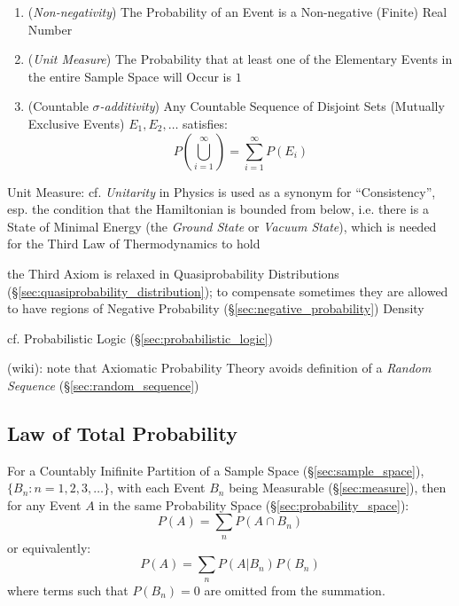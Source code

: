 \begin{enumerate}
  \item (\emph{Non-negativity}) The Probability of an Event is a Non-negative
    (Finite) Real Number
  \item (\emph{Unit Measure}) The Probability that at least one of the
    Elementary Events in the entire Sample Space will Occur is $1$
  \item (Countable \emph{$\sigma$-additivity}) Any Countable Sequence of
    Disjoint Sets (Mutually Exclusive Events) $E_1, E_2, \ldots$ satisfies:
    \[
      P (\bigcup_{i=1}^\infty) = \sum_{i=1}^\infty P(E_i)
    \]
\end{enumerate}

\fist Unit Measure: cf. \emph{Unitarity} in Physics is used as a synonym for
``Consistency'', esp. the condition that the Hamiltonian is bounded from below,
i.e. there is a State of Minimal Energy (the \emph{Ground State} or
\emph{Vacuum State}), which is needed for the Third Law of Thermodynamics to
hold

the Third Axiom is relaxed in Quasiprobability Distributions
(\S\ref{sec:quasiprobability_distribution}); to compensate sometimes they are
allowed to have regions of Negative Probability
(\S\ref{sec:negative_probability}) Density

\fist cf. Probabilistic Logic (\S\ref{sec:probabilistic_logic})

(wiki): note that Axiomatic Probability Theory avoids definition of a
\emph{Random Sequence} (\S\ref{sec:random_sequence})



\subsection{Law of Total Probability}\label{sec:total_probability}

For a Countably Inifinite Partition of a Sample Space
(\S\ref{sec:sample_space}), $\{ B_n : n = 1,2,3,\ldots \}$, with each Event
$B_n$ being Measurable (\S\ref{sec:measure}), then for any Event $A$ in the same
Probability Space (\S\ref{sec:probability_space}):
\[
  P(A) = \sum_n P(A \cap B_n)
\]
or equivalently:
\[
  P(A) = \sum_n P(A|B_n) P(B_n)
\]
where terms such that $P(B_n) = 0$ are omitted from the summation.



